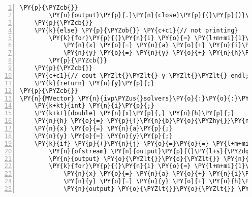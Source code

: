 \begin{Verbatim}[tabsize=2,commandchars=\\\{\},numbers=left,firstnumber=1,stepnumber=1]
		\PY{p}{\PYZcb{}}
		\PY{n}{output}\PY{p}{.}\PY{n}{close}\PY{p}{(}\PY{p}{)}\PY{p}{;}
	\PY{p}{\PYZcb{}}
	\PY{k}{else} \PY{p}{\PYZob{}} \PY{c+c1}{// not printing}
		\PY{k}{for}\PY{p}{(}\PY{n}{i} \PY{o}{=} \PY{l+m+mi}{1}\PY{p}{;} \PY{n}{i} \PY{o}{\PYZlt{}} \PY{n}{steps}\PY{o}{+}\PY{l+m+mi}{1}\PY{p}{;} \PY{n}{i}\PY{o}{+}\PY{o}{+}\PY{p}{)}\PY{p}{\PYZob{}}
			\PY{n}{x} \PY{o}{=} \PY{n}{a} \PY{o}{+} \PY{n}{i}\PY{o}{*}\PY{n}{h}\PY{p}{;}
			\PY{n}{y} \PY{o}{=} \PY{n}{y} \PY{o}{+} \PY{n}{h}\PY{o}{*}\PY{n}{f}\PY{p}{(}\PY{n}{x}\PY{p}{,} \PY{n}{y}\PY{p}{)}\PY{p}{;}
		\PY{p}{\PYZcb{}}
	\PY{p}{\PYZcb{}}
	\PY{c+c1}{// cout \PYZlt{}\PYZlt{} y \PYZlt{}\PYZlt{} endl; // optional print}
	\PY{k}{return} \PY{n}{y}\PY{p}{;}
\PY{p}{\PYZcb{}}
\PY{n}{MVector} \PY{n}{ivp\PYZus{}solvers}\PY{o}{:}\PY{o}{:}\PY{n}{midpoint}\PY{p}{(}\PY{n}{MVector} \PY{o}{\PYZam{}}\PY{n}{y}\PY{p}{,} \PY{n}{MFunction} \PY{o}{\PYZam{}}\PY{n}{f}\PY{p}{,} \PY{k+kt}{int} \PY{n}{j}\PY{p}{)}\PY{p}{\PYZob{}}
	\PY{k+kt}{int} \PY{n}{i}\PY{p}{;}
	\PY{k+kt}{double} \PY{n}{x}\PY{p}{,} \PY{n}{h}\PY{p}{;}
	\PY{n}{h} \PY{o}{=} \PY{p}{(}\PY{n}{b}\PY{o}{\PYZhy{}}\PY{n}{a}\PY{p}{)}\PY{o}{/}\PY{n}{steps}\PY{p}{;}
	\PY{n}{x} \PY{o}{=} \PY{n}{a}\PY{p}{;}
	\PY{n}{y} \PY{o}{=} \PY{n}{y}\PY{p}{;}
	\PY{k}{if} \PY{p}{(}\PY{n}{j} \PY{o}{=}\PY{o}{=} \PY{l+m+mi}{1}\PY{p}{)}\PY{p}{\PYZob{}} \PY{c+c1}{//printing}
		\PY{n}{ofstream} \PY{n}{output}\PY{p}{(}\PY{l+s}{\PYZdq{}}\PY{l+s}{output\PYZus{}midpoint.csv}\PY{l+s}{\PYZdq{}}\PY{p}{)}\PY{p}{;}
		\PY{n}{output} \PY{o}{\PYZlt{}}\PY{o}{\PYZlt{}} \PY{n}{x} \PY{o}{\PYZlt{}}\PY{o}{\PYZlt{}} \PY{l+s}{\PYZdq{}}\PY{l+s}{,}\PY{l+s}{\PYZdq{}} \PY{o}{\PYZlt{}}\PY{o}{\PYZlt{}} \PY{n}{y}\PY{p}{[}\PY{l+m+mi}{0}\PY{p}{]} \PY{o}{\PYZlt{}}\PY{o}{\PYZlt{}} \PY{l+s}{\PYZdq{}}\PY{l+s}{,}\PY{l+s}{\PYZdq{}} \PY{o}{\PYZlt{}}\PY{o}{\PYZlt{}} \PY{n}{y}\PY{p}{[}\PY{l+m+mi}{1}\PY{p}{]} \PY{o}{\PYZlt{}}\PY{o}{\PYZlt{}} \PY{n}{endl}\PY{p}{;}
		\PY{k}{for}\PY{p}{(}\PY{n}{i} \PY{o}{=} \PY{l+m+mi}{1}\PY{p}{;} \PY{n}{i} \PY{o}{\PYZlt{}} \PY{n}{steps}\PY{o}{+}\PY{l+m+mi}{1}\PY{p}{;} \PY{n}{i}\PY{o}{+}\PY{o}{+}\PY{p}{)}\PY{p}{\PYZob{}}
			\PY{n}{x} \PY{o}{=} \PY{n}{a} \PY{o}{+} \PY{n}{i}\PY{o}{*}\PY{n}{h}\PY{p}{;}
			\PY{n}{y} \PY{o}{=} \PY{n}{y} \PY{o}{+} \PY{n}{h}\PY{o}{*}\PY{n}{f}\PY{p}{(}\PY{n}{x} \PY{o}{+} \PY{l+m+mf}{0.5}\PY{o}{*}\PY{n}{h}\PY{p}{,} \PY{n}{y} \PY{o}{+} \PY{l+m+mf}{0.5}\PY{o}{*}\PY{n}{h}\PY{o}{*}\PY{n}{f}\PY{p}{(}\PY{n}{x}\PY{p}{,}\PY{n}{y}\PY{p}{)}\PY{p}{)}\PY{p}{;}
			\PY{n}{output} \PY{o}{\PYZlt{}}\PY{o}{\PYZlt{}} \PY{n}{x} \PY{o}{\PYZlt{}}\PY{o}{\PYZlt{}} \PY{l+s}{\PYZdq{}}\PY{l+s}{,}\PY{l+s}{\PYZdq{}} \PY{o}{\PYZlt{}}\PY{o}{\PYZlt{}} \PY{n}{y}\PY{p}{[}\PY{l+m+mi}{0}\PY{p}{]} \PY{o}{\PYZlt{}}\PY{o}{\PYZlt{}} \PY{l+s}{\PYZdq{}}\PY{l+s}{,}\PY{l+s}{\PYZdq{}} \PY{o}{\PYZlt{}}\PY{o}{\PYZlt{}} \PY{n}{y}\PY{p}{[}\PY{l+m+mi}{1}\PY{p}{]} \PY{o}{\PYZlt{}}\PY{o}{\PYZlt{}} \PY{n}{endl}\PY{p}{;}

\end{Verbatim}
